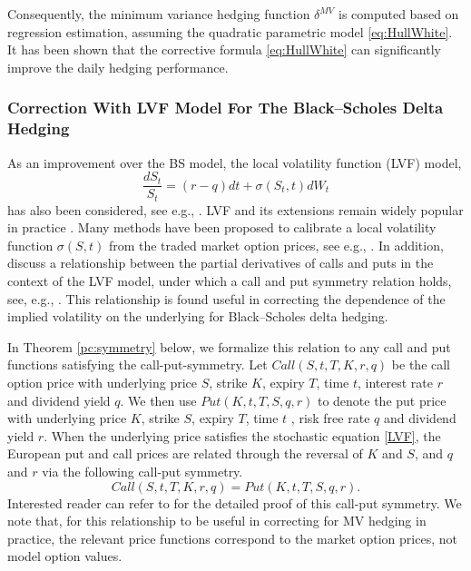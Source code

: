 \documentclass[letterpaper,12pt,titlepage,oneside,final]{book}
\numberwithin{equation}{section}
\theoremstyle{definition}
\begin{document}
 Consequently, the minimum variance hedging function $ \delta^{MV}$ is computed based on regression estimation, assuming 
 the quadratic parametric model \eqref{eq:HullWhite}.
 It has been shown \cite{hulloptimal} that the corrective formula \eqref{eq:HullWhite} can significantly improve the daily hedging performance.

 \subsubsection{Correction With LVF Model For  The Black–Scholes Delta Hedging}
 As an improvement over the BS model, the local volatility function (LVF) model,
 \begin{equation}\label{LVF}
\frac{dS_t}{S_t} = (r-q) dt + \sigma(S_t,t)   dW_t
\end{equation}
 has also been considered, see e.g., \citep{Dupire94,DermanKani94,DermanKani96}.
  LVF and its extensions remain widely popular in practice \cite{coleman2001reconstructing,crepey2004delta}. Many methods have been proposed to calibrate a local volatility function $\sigma(S,t)$ from the traded market option prices, see e.g., \citep{JackwerthRubenstein96,Andersen-etal98,CLV98}. In addition, \citet{coleman2001} discuss a relationship between the partial derivatives of  calls and puts in the context of the LVF model, under which a call and put symmetry relation holds, see,  e.g., \citep{Carr94,Carr98}. This relationship is found useful in correcting the dependence of the implied volatility on the underlying for Black–Scholes delta hedging.

In Theorem \ref{pc:symmetry} below, we formalize this relation \citep{coleman2001} to any call and put functions satisfying the call-put-symmetry.
Let $Call(S,t,T,K,r,q)$  be the call option price with underlying price $S$, strike $K$, expiry $T$, time $t$, interest rate $r$ and dividend yield $q$. We then use $Put(K,t,T,S,q,r)$ to denote  the put price with underlying price $K$, strike $S$, expiry $T$, time $t$ , risk free rate  $q$ and dividend yield $r$.  When the underlying price satisfies the stochastic equation \eqref{LVF}, the European put and call prices are related through the reversal of $K$ and $S$, and $q$ and $r$ via the following call-put symmetry.
\begin{equation}
	Call(S, t,T,K,r, q)=Put(K, t,T,S , q, r).
	\label{eq:callputsymmetry}
\end{equation}
Interested reader can refer to \cite{guo2018black,coleman2001} for the detailed proof of this call-put symmetry.
 We note that, for this relationship to be useful in correcting for MV hedging in practice, the relevant price functions  correspond to the market option prices, not model option values.
\end{document}
